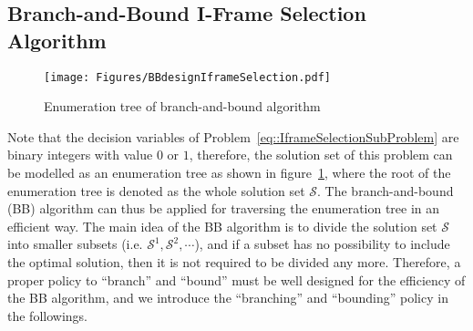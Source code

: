 \subsection{Branch-and-Bound I-Frame Selection Algorithm}
\label{sec::proposedBBAlg}
\begin{figure}
\begin{center}
\texttt{[image: Figures/BBdesignIframeSelection.pdf]}
\caption{\label{fig::BBdesgin}Enumeration tree of branch-and-bound algorithm}
\end{center}
\end{figure}
Note that the decision variables of Problem~\eqref{eq::IframeSelectionSubProblem} are binary integers with value $0$ or $1$, therefore, the  solution set of this problem can be modelled as an enumeration tree as shown in figure~\ref{fig::BBdesgin}, where the root of the enumeration tree is denoted as the whole solution set $\mathcal{S}$.
The branch-and-bound (BB) algorithm can thus be applied for traversing the enumeration tree in an efficient way.
The main idea of the BB algorithm is to divide the solution set $\mathcal{S}$ into smaller subsets (i.e. $\mathcal{S}^1, \mathcal{S}^2, \cdots$), and if a subset has no possibility to include the optimal solution, then it is not required to be divided any more.
Therefore, a proper policy to ``branch'' and ``bound'' must be well designed for the efficiency of the BB algorithm, and we introduce the ``branching'' and ``bounding'' policy in the followings.
%
